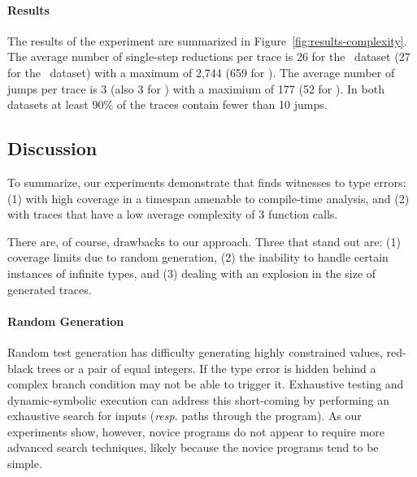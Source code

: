 \paragraph{Results}
\label{sec:results-complexity}
The results of the experiment are summarized in
Figure~\ref{fig:results-complexity}.
%
The average number of single-step reductions per trace is 26 for the \ucsdbench\
dataset (27 for the \uwbench\ dataset) with a maximum of 2,744 (659 for
\uwbench). The average number of jumps per trace is 3 (also 3 for
\uwbench) with a maximium of 177 (52 for \uwbench). In both datasets at
least 90\% of the traces contain fewer than 10 jumps.
%

\subsection{Discussion}
\label{sec:discussion}

To summarize, our experiments demonstrate that \nanomaly finds witnesses
to type errors: (1) with high coverage in a timespan amenable to
compile-time analysis, and (2) with traces that have a low average
complexity of 3 function calls.

There are, of course, drawbacks to our approach. Three that stand out
are: (1) coverage limits due to random generation, (2) the inability to
handle certain instances of infinite types, and (3) dealing with an
explosion in the size of generated traces.

\paragraph{Random Generation}
Random test generation has difficulty generating highly constrained
values, \eg red-black trees or a pair of equal integers. If the type
error is hidden behind a complex branch condition \nanomaly may not be
able to trigger it. Exhaustive testing and dynamic-symbolic execution
can address this short-coming by performing an exhaustive search for
inputs (\emph{resp}. paths through the program). As our experiments
show, however, novice programs do not appear to require more advanced
search techniques, likely because the novice programs tend to be simple.

